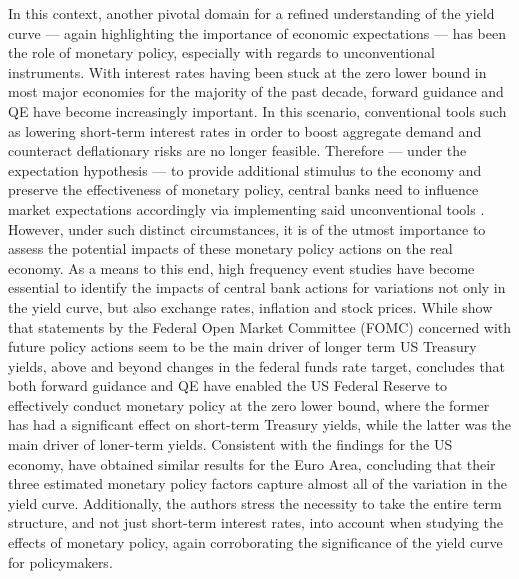 In this context, another pivotal domain for a refined understanding of the yield curve --- again highlighting the importance of economic expectations --- has been the role of monetary policy, especially with regards to unconventional instruments.
With interest rates having been stuck at the zero lower bound in most major economies for the majority of the past decade, forward guidance and QE have become increasingly important.  
In this scenario, conventional tools such as lowering short-term interest rates in order to boost aggregate demand and counteract deflationary risks are no longer feasible.
Therefore --- under the expectation hypothesis --- to provide additional stimulus to the economy and preserve the effectiveness of monetary policy, central banks need to influence market expectations accordingly via implementing said unconventional tools \citep{Gürkaynak_Wright_2012}.
However, under such distinct circumstances, it is of the utmost importance to assess the potential impacts of these monetary policy actions on the real economy.
As a means to this end, high frequency event studies 
have become essential to identify the impacts of central bank actions for variations not only in the yield curve, but also exchange rates, inflation and stock prices.
While \citet{gurkaynak2005actions} show that statements by the Federal Open Market Committee (FOMC) concerned with future policy actions seem to be the main driver of longer term US Treasury yields, above and beyond changes in the federal funds rate target, \citet{SWANSON202132} concludes that both forward guidance and QE have enabled the US Federal Reserve to effectively conduct monetary policy at the zero lower bound, where the former has had a significant effect on short-term Treasury yields, while the latter was the main driver of loner-term yields.
Consistent with the findings for the US economy, \citet{ALTAVILLA2019162} have obtained similar results for the Euro Area, concluding that their three estimated monetary policy factors capture almost all of the variation in the yield curve. 
Additionally, the authors stress the necessity to take the entire term structure, and not just short-term interest rates, into account when studying the effects of monetary policy, again corroborating the significance of the yield curve for policymakers. 

